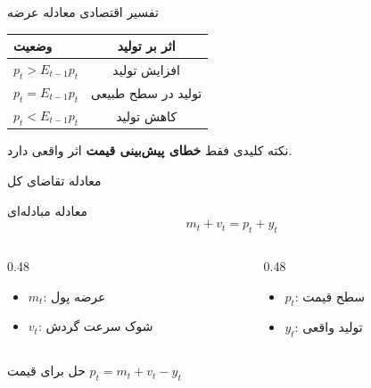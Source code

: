 \documentclass[aspectratio=169,11pt]{beamer}
\newcommand{\important}[1]{\textcolor{AlertRed}{\textbf{#1}}}
\begin{document}
\begin{frame}{تفسیر اقتصادی معادله عرضه}
	\begin{center}
		\renewcommand{\arraystretch}{1.5}
		\begin{tabular}{lc}
			\toprule
			\textbf{وضعیت}     & \textbf{اثر بر تولید}                  \\
			\midrule
			$p_t > E_{t-1}p_t$ & \textcolor{SuccessGreen}{افزایش تولید} \\
			$p_t = E_{t-1}p_t$ & تولید در سطح طبیعی                     \\
			$p_t < E_{t-1}p_t$ & \textcolor{AlertRed}{کاهش تولید}       \\
			\bottomrule
		\end{tabular}
	\end{center}
	\vspace{0.5cm}
	\begin{alertblock}{نکته کلیدی}
		فقط \important{خطای پیش‌بینی قیمت} اثر واقعی دارد.
	\end{alertblock}
\end{frame}

\begin{frame}{معادله تقاضای کل}
	\begin{block}{معادله مبادله‌ای}
		\centering
		\large
		\[
			m_t + v_t = p_t + y_t
		\]
	\end{block}
	\vspace{0.3cm}
	\begin{LTR}
		\begin{columns}[T]
			\begin{column}{0.48\textwidth}
				\begin{RTL}
					\begin{itemize}
						\item $m_t$: عرضه پول
						\item $v_t$: شوک سرعت گردش
					\end{itemize}
				\end{RTL}
			\end{column}
			\hfill
			\begin{column}{0.48\textwidth}
				\begin{RTL}
					\begin{itemize}
						\item $p_t$: سطح قیمت
						\item $y_t$: تولید واقعی
					\end{itemize}
				\end{RTL}
			\end{column}
		\end{columns}
	\end{LTR}
	\vspace{0.3cm}
	\begin{exampleblock}{حل برای قیمت}
		\centering
		$p_t = m_t + v_t - y_t$
	\end{exampleblock}
\end{frame}
\end{document}
